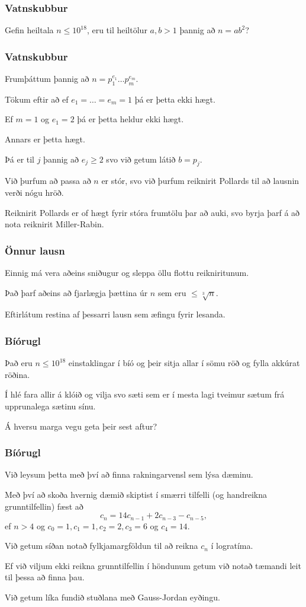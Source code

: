 {
	\frametitle{Vatnskubbur}
	{
		\item<1-> Gefin heiltala $n \leq 10^{18}$, eru til heiltölur $a, b > 1$ þannig að $n = ab^2$?
	}
}

{
	\frametitle{Vatnskubbur}
	{
		\item<1-> Frumþáttum þannig að $n = p_1^{e_1} \dots p_m^{e_m}$.
		\item<2-> Tökum eftir að ef $e_1 = \dots = e_m = 1$ þá er þetta ekki hægt.
		\item<3-> Ef $m = 1$ og $e_1 = 2$ þá er þetta heldur ekki hægt.
		\item<4-> Annars er þetta hægt.
		\item<5-> Þá er til $j$ þannig að $e_j \geq 2$ svo við getum látið $b = p_j$.
		\item<6-> Við þurfum að passa að $n$ er stór, svo við þurfum reiknirit Pollards til að lausnin verði nógu hröð.
        \item<7-> Reiknirit Pollards er of hægt fyrir stóra frumtölu þar að auki, svo byrja þarf á að nota reiknirit Miller-Rabin.
	}
}

{
    \frametitle{Önnur lausn}
    {
        \item<1-> Einnig má vera aðeins sniðugur og sleppa öllu flottu reikniritunum.
        \item<2-> Það þarf aðeins að fjarlægja þættina úr $n$ sem eru $\leq \sqrt[3]{n}$.
        \item<3-> Eftirlátum restina af þessarri lausn sem æfingu fyrir lesanda.
    }
}

{
	\frametitle{Bíórugl}
	{
		\item<1-> Það eru $n \leq 10^{18}$ einstaklingar í bíó og þeir sitja allar í sömu röð og fylla akkúrat röðina.
		\item<2-> Í hlé fara allir á klóið og vilja svo sæti sem er í mesta lagi tveimur sætum frá upprunalega sætinu sínu.
		\item<3-> Á hversu marga vegu geta þeir sest aftur?
	}
}

{
	\frametitle{Bíórugl}
	{
		\item<1-> Við leysum þetta með því að finna rakningarvensl sem lýsa dæminu.
		\item<2-> Með því að skoða hvernig dæmið skiptist í smærri tilfelli (og handreikna grunntilfellin) fæst að
		\[
			c_n = 14c_{n - 1} + 2c_{n - 3} - c_{n - 5},
		\]
		ef $n > 4$ og $c_0 = 1, c_1 = 1, c_2 = 2, c_3 = 6$ og $c_4 = 14$.
		\item<3-> Við getum síðan notað fylkjamargföldun til að reikna $c_n$ í logratíma.
		\item<4-> Ef við viljum ekki reikna grunntilfellin í höndunum getum við notað tæmandi leit til þessa að finna þau.
		\item<5-> Við getum líka fundið stuðlana með Gauss-Jordan eyðingu.
	}
}

